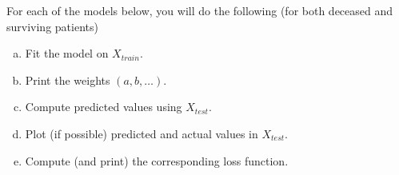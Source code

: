 \documentclass[../../assignment4.tex]{subfiles}
\begin{document}
    For each of the models below, you will do the following (for both deceased and surviving patients)
    \begin{enumerate}[(a)]
        \item Fit the model on $X_{train}$.
        \item Print the weights $(a, b, \dots)$.
        \item Compute predicted values using $X_{test}$.
        \item Plot (if possible) predicted and actual values in $X_{test}$.
        \item Compute (and print) the corresponding loss function.
    \end{enumerate}

\end{document}

